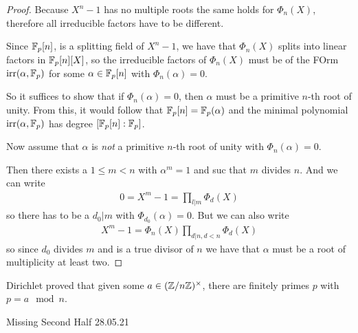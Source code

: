 \begin{proof}
  Because $X^{n} -1$ has no multiple roots the same holds for $\Phi_n(X)$, therefore all irreducible factors have to be different.

  Since $\mathbb{F}_p[n]$, is a splitting field of $X^{n}-1$, we have that $\Phi_n(X)$ splits into linear factors in $\mathbb{F}_p[n][X]$, so the irreducible factors of $\Phi_n(X)$ must be of the FOrm $\text{irr}(\alpha,\mathbb{F}_p)$ for some $\alpha \in \mathbb{F}_p[n]$ with $\Phi_n(\alpha) = 0$.

  So it suffices to show that if $\Phi_n(\alpha) = 0$, then $\alpha$ must be a primitive $n$-th root of unity.
  From this, it would follow that $\mathbb{F}_p[n] = \mathbb{F}_p(\alpha)$ and the minimal polynomial $\text{irr}(\alpha,\mathbb{F}_p)$ has degree $[\mathbb{F}_p[n] : \mathbb{F}_p]$.

  Now assume that $\alpha$ is \emph{not} a primitive $n$-th root of unity with $\Phi_n(\alpha) = 0$.

  Then there exists a $1 \leq m <n$ with $\alpha^{m} = 1$ and suc that $m$ divides $n$.
  And we can write
  \begin{align*}
    0 = X^{m} - 1 = \prod_{l | m} \Phi_d(X) 
  \end{align*}
  so there has to be a $d_0 | m$ with $\Phi_{d_0}(\alpha) = 0$.
  But we can also write
  \begin{align*}
    X^{m} -1 = \Phi_n(X) \prod_{d|n, d < n} \Phi_d(X)
  \end{align*}
  so since $d_0$ divides $m$ and is a true divisor of $n$ we have that $\alpha$ must be a root of multiplicity at least two.
\end{proof}


Dirichlet proved that given some $a \in (\mathbb{Z}/n\mathbb{Z})^{\times}$, there are finitely primes $p$ with $p = a \mod n$.


\begin{center}
Missing Second Half 28.05.21
\end{center}
